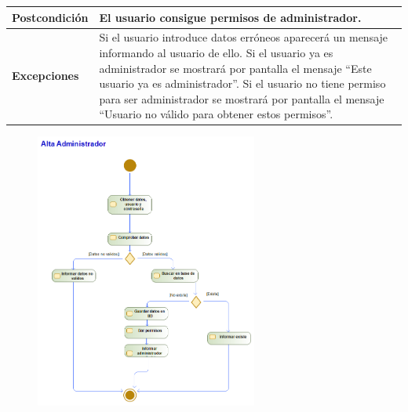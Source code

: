 \begin{table}[H]
\begin{tabularx}{0.8\textwidth}{|p{3.5cm}|X|}
        \hline
        \textbf{Postcondición}    & El usuario consigue permisos de administrador.                                                                                                                                                                                                                                                                                                      \\
        \hline
        \textbf{Excepciones}      & Si el usuario introduce datos erróneos aparecerá un mensaje informando al usuario de ello. Si el usuario ya es administrador se mostrará por pantalla el mensaje ``Este usuario ya es administrador''. Si el usuario no tiene permiso para ser administrador se mostrará por pantalla el mensaje ``Usuario no válido para obtener estos permisos''. \\
        \hline
    \end{tabularx}
\end{table}
\begin{figure}[H]
    \centering
    \includegraphics[width=0.65\textwidth]{Use_Cases/alta_admin.png}
\end{figure}
\newpage
